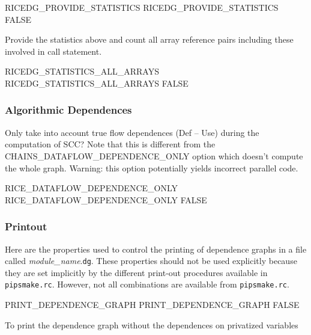\documentclass[a4paper]{report}
\begin{document}
\begin{PipsProp}{RICEDG_PROVIDE_STATISTICS}
RICEDG_PROVIDE_STATISTICS FALSE
\end{PipsProp}

Provide the statistics above and count all array reference pairs
including these involved in call statement.

\begin{PipsProp}{RICEDG_STATISTICS_ALL_ARRAYS}
RICEDG_STATISTICS_ALL_ARRAYS FALSE
\end{PipsProp}

\subsubsection{Algorithmic Dependences}

Only take into account true flow dependences (Def -- Use) during the
computation of SCC?  Note that this is different from the
CHAINS\_DATAFLOW\_DEPENDENCE\_ONLY option which doesn't compute the
whole graph.  Warning: this option potentially yields incorrect parallel
code.

\begin{PipsProp}{RICE_DATAFLOW_DEPENDENCE_ONLY}
RICE_DATAFLOW_DEPENDENCE_ONLY FALSE
\end{PipsProp}

\subsubsection{Printout}

Here are the properties used to control the printing of dependence
graphs in a file called {\em module\_name}.{\tt dg}. These properties
should not be used explicitly because they are set implicitly by the
different print-out procedures available in \verb/pipsmake.rc/. However,
not all combinations are available from \verb/pipsmake.rc/.

\begin{PipsProp}{PRINT_DEPENDENCE_GRAPH}
PRINT_DEPENDENCE_GRAPH FALSE
\end{PipsProp}

To print the dependence graph without the dependences on privatized
variables
\end{document}
